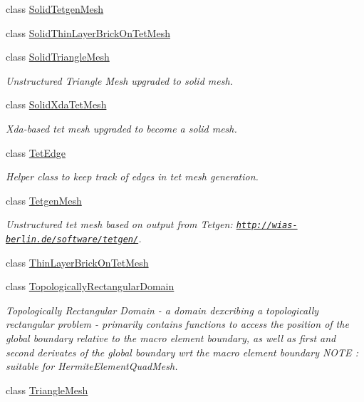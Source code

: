 \begin{DoxyCompactItemize}
class \hyperlink{classoomph_1_1SolidTetgenMesh}{Solid\+Tetgen\+Mesh}
\item 
class \hyperlink{classoomph_1_1SolidThinLayerBrickOnTetMesh}{Solid\+Thin\+Layer\+Brick\+On\+Tet\+Mesh}
\item 
class \hyperlink{classoomph_1_1SolidTriangleMesh}{Solid\+Triangle\+Mesh}
\begin{DoxyCompactList}\small\item\em Unstructured Triangle Mesh upgraded to solid mesh. \end{DoxyCompactList}\item 
class \hyperlink{classoomph_1_1SolidXdaTetMesh}{Solid\+Xda\+Tet\+Mesh}
\begin{DoxyCompactList}\small\item\em Xda-\/based tet mesh upgraded to become a solid mesh. \end{DoxyCompactList}\item 
class \hyperlink{classoomph_1_1TetEdge}{Tet\+Edge}
\begin{DoxyCompactList}\small\item\em Helper class to keep track of edges in tet mesh generation. \end{DoxyCompactList}\item 
class \hyperlink{classoomph_1_1TetgenMesh}{Tetgen\+Mesh}
\begin{DoxyCompactList}\small\item\em Unstructured tet mesh based on output from Tetgen\+: \href{http://wias-berlin.de/software/tetgen/}{\tt http\+://wias-\/berlin.\+de/software/tetgen/}. \end{DoxyCompactList}\item 
class \hyperlink{classoomph_1_1ThinLayerBrickOnTetMesh}{Thin\+Layer\+Brick\+On\+Tet\+Mesh}
\item 
class \hyperlink{classoomph_1_1TopologicallyRectangularDomain}{Topologically\+Rectangular\+Domain}
\begin{DoxyCompactList}\small\item\em Topologically Rectangular Domain -\/ a domain dexcribing a topologically rectangular problem -\/ primarily contains functions to access the position of the global boundary relative to the macro element boundary, as well as first and second derivates of the global boundary wrt the macro element boundary N\+O\+TE \+: suitable for Hermite\+Element\+Quad\+Mesh. \end{DoxyCompactList}\item 
class \hyperlink{classoomph_1_1TriangleMesh}{Triangle\+Mesh}

\end{DoxyCompactItemize}
